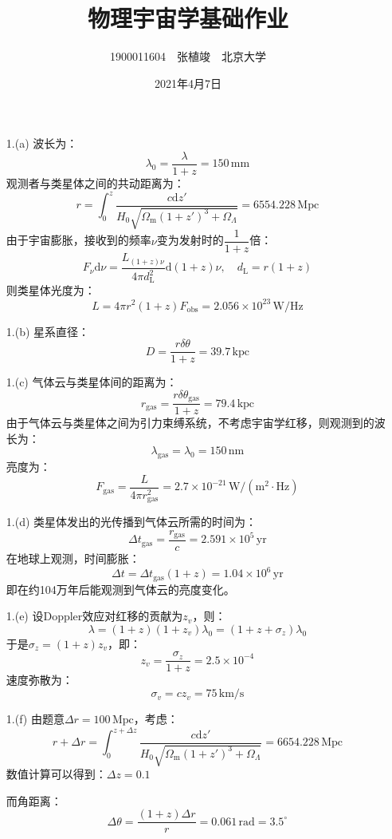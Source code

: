 \documentclass[a4paper,fontset=none]{ctexart}
\begin{document}
\title{\textbf{物理宇宙学基础作业}}
\author{1900011604\ \ 张植竣\ \ 北京大学}
\date{2021年4月7日}
\maketitle

\begin{itemize}

    \item[1.(a)]
    波长为：
    \[
    \lambda_0 = \frac{\lambda}{1+z} = 150\,\mathrm{mm}
    \]
    观测者与类星体之间的共动距离为：
    \[
    r = \int_0^z\frac{c\mathrm{d}z'}{H_0\sqrt{\Omega_\mathrm{m}(1+z')^3+\Omega_\Lambda}} = 6554.228\,\mathrm{Mpc}
    \]
    由于宇宙膨胀，接收到的频率$\nu$变为发射时的$\dfrac{1}{1+z}$倍：
    \[
    F_\nu\mathrm{d}\nu = \frac{L_{(1+z)\nu}}{4\pi d_\mathrm{L}^2}\mathrm{d}(1+z)\nu,\quad
        d_\mathrm{L} = r(1+z)
    \]
    则类星体光度为：
    \[
    L = 4\pi r^2(1+z)F_\mathrm{obs} = 2.056\times10^{23}\,\mathrm{W/Hz}
    \]

    \item[1.(b)]
    星系直径：
    \[
    D = \frac{r\delta\theta}{1+z} = 39.7\,\mathrm{kpc}
    \]

    \item[1.(c)]
    气体云与类星体间的距离为：
    \[
    r_\mathrm{gas} = \frac{r\delta\theta_\mathrm{gas}}{1+z} = 79.4\,\mathrm{kpc}
    \]
    由于气体云与类星体之间为引力束缚系统，不考虑宇宙学红移，则观测到的波长为：
    \[
    \lambda_\mathrm{gas} = \lambda_0 = 150\,\mathrm{nm}
    \]
    亮度为：
    \[
    F_\mathrm{gas} = \frac{L}{4\pi r_\mathrm{gas}^2} = 2.7\times10^{-21}\,\mathrm{W/(m^2\cdot Hz)}
    \]

    \item[1.(d)]
    类星体发出的光传播到气体云所需的时间为：
    \[
    \Delta t_\mathrm{gas} = \frac{r_\mathrm{gas}}{c} = 2.591\times10^{5}\,\mathrm{yr}
    \]
    在地球上观测，时间膨胀：
    \[
    \Delta t = \Delta t_\mathrm{gas}(1+z) = 1.04\times10^{6}\,\mathrm{yr}
    \]
    即在约104万年后能观测到气体云的亮度变化。

    \item[1.(e)]
    设Doppler效应对红移的贡献为$z_v$，则：
    \[
    \lambda = (1+z)(1+z_v)\lambda_0 = (1+z+\sigma_z)\lambda_0
    \]
    于是$\sigma_z=(1+z)z_v$，即：
    \[
    z_v = \frac{\sigma_z}{1+z} = 2.5\times10^{-4}
    \]
    速度弥散为：
    \[
    \sigma_v = cz_v = 75\,\mathrm{km/s}
    \]

    \item[1.(f)]
    由题意$\Delta r=100\,\mathrm{Mpc}$，考虑：
    \[
    r+\Delta r = \int_0^{z+\Delta z}\frac{c\mathrm{d}z'}{H_0\sqrt{\Omega_\mathrm{m}(1+z')^3+\Omega_\Lambda}} = 6654.228\,\mathrm{Mpc}
    \]
    数值计算可以得到：$\Delta z=0.1$
    
    而角距离：
    \[
    \Delta \theta = \frac{(1+z)\Delta r}{r} = 0.061\,\mathrm{rad} = 3.5^\circ
    \]

\end{itemize}
\end{document}

